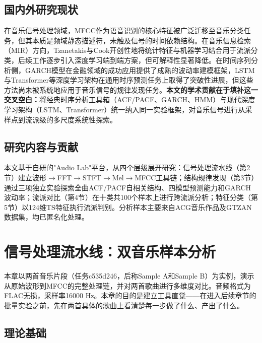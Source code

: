 \documentclass[12pt,a4paper]{article}
\begin{document}
\subsection*{国内外研究现状}

在音乐信号处理领域，MFCC作为语音识别的核心特征被广泛迁移至音乐分类任务\cite{tzanetakis2002}\cite{mcfee2015}，但其本质是频域静态描述符，未触及信号的时间依赖结构。在音乐信息检索（MIR）方向，Tzanetakis与Cook开创性地将统计特征与机器学习结合用于流派分类\cite{tzanetakis2002}，后续工作逐步引入深度学习端到端方案，但可解释性显著降低。在时间序列分析侧，GARCH模型在金融领域的成功应用\cite{bollerslev1986}提供了成熟的波动率建模框架，LSTM\cite{hochreiter1997}与Transformer\cite{vaswani2017}等深度学习架构在通用时序预测任务上取得了突破性进展，但这些方法尚未被系统地应用于音乐信号的规律发现任务。\textbf{本文的学术贡献在于填补这一交叉空白：}将经典时序分析工具箱（ACF/PACF、GARCH、HMM）与现代深度学习架构（LSTM、Transformer）统一纳入同一实验框架，对音乐信号进行从采样点到流派级的多尺度系统性探索。

\subsection*{研究内容与贡献}

本文基于自研的"Audio Lab"平台，从四个层级展开研究：信号处理流水线（第2节）建立波形$\to$FFT$\to$STFT$\to$Mel$\to$MFCC工具链；结构规律发现（第3节）通过三项独立实验探索全曲ACF/PACF自相关结构、四模型预测能力和GARCH波动率；流派对比（第4节）在十类共100个样本上进行跨流派分析；特征分类（第5节）以124维TS特征执行流派判别。分析样本主要来自ACG音乐作品及GTZAN数据集\cite{tzanetakis2002}，均已匿名化处理。

\FloatBarrier
\section{信号处理流水线：双音乐样本分析}

本章以两首音乐片段（任务c535d246，后称Sample A和Sample B）为实例，演示从原始波形到MFCC的完整处理链，并对两首歌曲进行多维度对比。音频格式为FLAC无损，采样率16000 Hz。本章的目的是建立工具直觉——在进入后续章节的批量实验之前，先在两首具体的歌曲上看清楚每一步做了什么、产出了什么。

\FloatBarrier
\subsection{理论基础}
\end{document}

